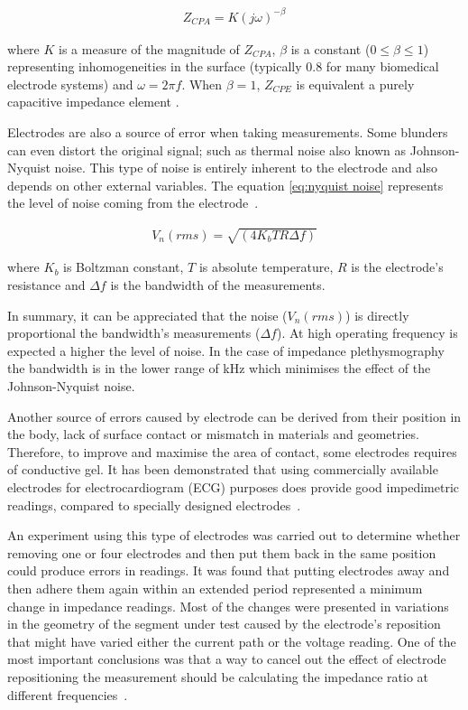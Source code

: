 \begin{align}
	\label{eq:zcpa}
	Z_{CPA} = K(j\omega)^{-\beta}
\end{align}

where $K$ is a measure of the magnitude of $Z_{CPA}$, $\beta$ is a constant ($0 \leq \beta \leq 1$) representing inhomogeneities in the surface (typically \num{0.8} for many biomedical electrode systems) and $\omega = 2\pi f$. When $\beta = 1$, $Z_{CPE}$ is equivalent a purely capacitive impedance element \cite{franks2005impedance,mcadams2006characterization,mcadams1995linear}.

Electrodes are also a source of error when taking measurements. Some blunders can even distort the original signal; such as thermal noise also known as Johnson-Nyquist noise. This type of noise is entirely inherent to the electrode and also depends on other external variables.  The equation \ref{eq:nyquist noise} represents the level of noise coming from the electrode~\cite{mcadams1995linear}.

\begin{align}
	\label{eq:nyquist noise}
	V_n(rms)=\sqrt{(4 K_b T R \Delta f)}
\end{align}

where $K_b$ is Boltzman constant, $T$ is absolute temperature, $R$ is the electrode’s resistance and $\Delta f$ is the bandwidth of the measurements. 

In summary, it can be appreciated that the noise ($V_n(rms)$) is directly proportional the bandwidth’s measurements ($\Delta f$). At high operating frequency is expected a higher the level of noise. In the case of impedance plethysmography the bandwidth is in the lower range of \si{\kilo\hertz} which minimises the effect of the Johnson-Nyquist noise.

Another source of errors caused by electrode can be derived from their position in the body, lack of surface contact or mismatch in materials and geometries. Therefore, to improve and maximise the area of contact, some electrodes requires of conductive gel. It has been demonstrated that using commercially available electrodes for electrocardiogram (ECG) purposes does provide good impedimetric readings, compared to specially designed electrodes~\cite{caicedo2012use}.

An experiment using this type of electrodes was carried out to determine whether removing one or four electrodes and then put them back in the same position could produce errors in readings. It was found that putting electrodes away and then adhere them again within an extended period represented a minimum change in impedance readings. Most of the changes were presented in variations in the geometry of the segment under test caused by the electrode's reposition that might have varied either the current path or the voltage reading. One of the most important conclusions was that a way to cancel out the effect of electrode repositioning the measurement should be calculating the impedance ratio at different frequencies~\cite{lozano1997electrode}.

